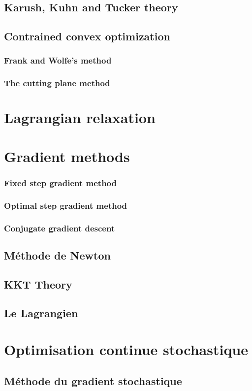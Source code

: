\documentclass[12pt,openany,oneside]{book}
\theoremstyle{definition}
\numberwithin{definition}{section}
\numberwithin{theorem}{section}
\numberwithin{corollary}{section}
\numberwithin{proposition}{section}
\numberwithin{notation}{section}
\numberwithin{remark}{section}
\numberwithin{hypothesis}{section}
\numberwithin{example}{section}
\begin{document}
\subsection{Karush, Kuhn and Tucker theory}
\subsection{Contrained convex optimization}
\subsubsection{Frank and Wolfe's method}
\subsubsection{The cutting plane method}
\section{Lagrangian relaxation}
\section{Gradient methods}
\subsubsection{Fixed step gradient method}
\subsubsection{Optimal step gradient method}
\subsubsection{Conjugate gradient descent}
\subsection{Méthode de Newton}
\subsection{KKT Theory}
\subsection{Le Lagrangien}
\section{Optimisation continue stochastique}
\subsection{Méthode du gradient stochastique}
\end{document}
